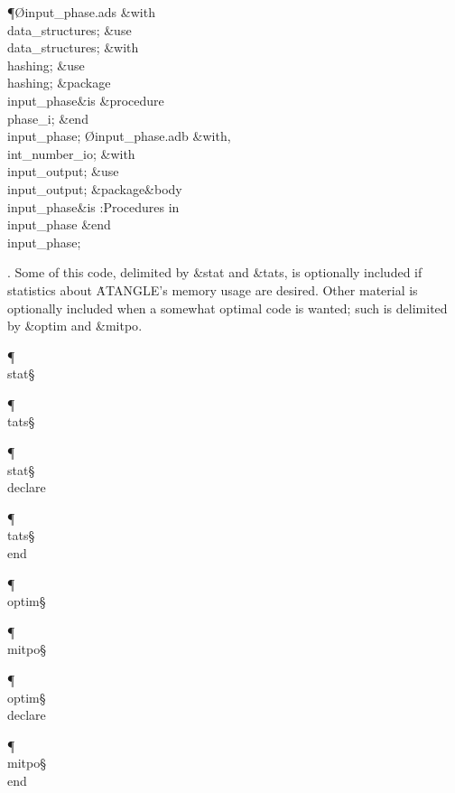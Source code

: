 \Y\P\O{input\_phase.ads}\?\6
\?\&{with}\8\\{data\_structures};\6
\&{use}\8\\{data\_structures};\6
\&{with}\8\\{hashing};\6
\&{use}\8\\{hashing};\6
\&{package}\8\1\\{input\_phase}\2\8\&{is}\8\1\6
\&{procedure}\8\1\\{phase\_i}\2;\2\6
\&{end}\8\\{input\_phase};\7
\O{input\_phase.adb}\?\6
\?\&{with}\8\?,\?\\{int\_number\_io};\6
\&{with}\8\\{input\_output};\6
\&{use}\8\\{input\_output};\6
\&{package}\8\1\&{body}\8\\{input\_phase}\2\8\&{is}\8\1\6
:Procedures in \\{input\_phase}\X\2\6
\&{end}\8\\{input\_phase};\par
\fi

. Some of this code, delimited by  \&{stat} and \&{tats}, is optionally
included if statistics about \.{ATANGLE}'s memory usage are desired.
Other material is optionally included when a somewhat optimal code is
wanted; such is delimited by  \&{optim} and \&{mitpo}.

\Y\P\4\D\\{stat}\?\S\B{}\6
\?\par
\P\4\D\\{tats}\?\S\?\hbox{}\?\T{}\6
\?\par
\P\4\F\\{stat}\?\S\?\\{declare}\par
\P\4\F\\{tats}\?\S\?\\{end}\par
\P\4\D\\{optim}\?\S\B{}\6
\?\par
\P\4\D\\{mitpo}\?\S\?\hbox{}\?\T{}\6
\?\par
\P\4\F\\{optim}\?\S\?\\{declare}\par
\P\4\F\\{mitpo}\?\S\?\\{end}\par
\fi

